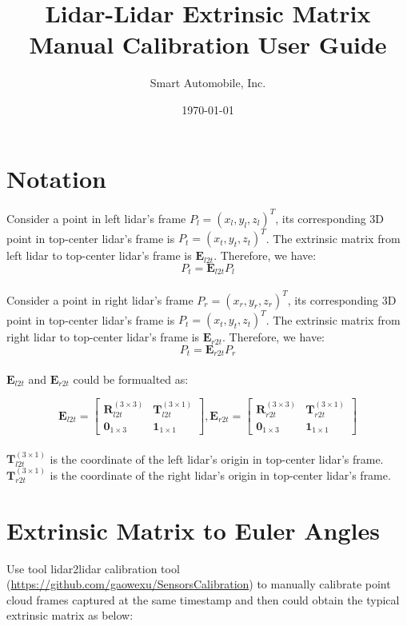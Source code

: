 \documentclass[
	letterpaper,
	10pt, 
]{CSUniSchoolLabReport}
\title{Lidar-Lidar Extrinsic Matrix Manual Calibration User Guide}
\author{Smart Automobile, Inc.}
\date{\today}
\begin{document}
\maketitle


\section{Notation}

Consider a point in left lidar's frame $P_l = (x_l, y_l, z_l)^T$, its corresponding 3D point in top-center lidar's frame is $P_t = (x_t, y_t, z_t)^T$. The extrinsic matrix from left lidar to top-center lidar's frame is $\bm{E}_{l2t}$. Therefore, we have:
\begin{equation}
P_t = \bm{E}_{l2t} P_l
\end{equation} \\

Consider a point in right lidar's frame $P_r = (x_r, y_r, z_r)^T$, its corresponding 3D point in top-center lidar's frame is $P_t = (x_t, y_t, z_t)^T$. The extrinsic matrix from right lidar to top-center lidar's frame is $\bm{E}_{r2t}$. Therefore, we have:
\begin{equation}
P_t = \bm{E}_{r2t} P_r
\end{equation} \\


$\bm{E}_{l2t}$ and $\bm{E}_{r2t}$ could be formualted as:

\begin{equation}
\bm{E}_{l2t} = \begin{bmatrix}
\bm{R}_{l2t}^{(3\times 3)} & \bm{T}_{l2t}^{(3\times 1)} \\
\bm{0}_{1\times 3} & \bm{1}_{1 \times 1}
\end{bmatrix},
\bm{E}_{r2t} = \begin{bmatrix}
\bm{R}_{r2t}^{(3\times 3)} & \bm{T}_{r2t}^{(3\times 1)} \\
\bm{0}_{1\times 3} & \bm{1}_{1 \times 1}
\end{bmatrix}
\end{equation} \\

$\bm{T}_{l2t}^{(3\times 1)}$ is the coordinate of the left lidar's origin in top-center lidar's frame.  \\
$\bm{T}_{r2t}^{(3\times 1)}$ is the coordinate of the right lidar's origin in top-center lidar's frame. 



\section{Extrinsic Matrix to Euler Angles}
Use tool lidar2lidar calibration tool (\url{https://github.com/gaowexu/SensorsCalibration})
 to manually calibrate point cloud frames captured at the same timestamp and then could obtain the typical extrinsic matrix as below: \\
\end{document}
